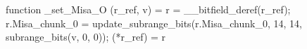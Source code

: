 function _set_Misa_O (r_ref, v) = {
    r = __bitfield_deref(r_ref);
    r.Misa_chunk_0 = update_subrange_bits(r.Misa_chunk_0, 14, 14, subrange_bits(v, 0, 0));
    (*r_ref) = r
}
